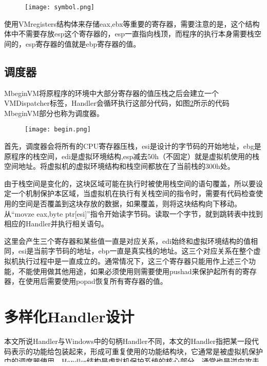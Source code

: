 \begin{figure}[htbp]
	
	\centering
	
	\texttt{[image: symbol.png]}
	\label{context}
\end{figure}

使用VMregisters结构体来存储eax,ebx等重要的寄存器，需要注意的是，这个结构体中不需要存放esp这个寄存器的，esp一直指向栈顶，而程序的执行本身需要栈空间的，esp寄存器的值就是ebp寄存器的值。

\subsection{调度器}

MbeginVM将原程序的环境中大部分寄存器的值压栈之后会建立一个VMDispatcher标签，Handler会循环执行这部分代码，如图\ref{begin}所示的代码MbeginVM部分也称为调度器。

\begin{figure}[htbp]
	\centering
	\texttt{[image: begin.png]}
	\label{begin}
\end{figure}


首先，调度器会将所有的CPU寄存器压栈，esi是设计的字节码的开始地址，ebg是原程序的栈空间，edi是虚拟环境结构,esp减去50h（不固定）就是虚拟机使用的栈空间地址。将虚拟机的虚拟环境结构和栈空间都放在了当前栈的300h处。

由于栈空间是变化的，这块区域可能在执行时被使用栈空间的语句覆盖，所以要设定一个机制保护本区域，当虚拟机在执行有关栈空间的指令时，需要有代码检查使用的空间是否覆盖到这块存放的数据，如果覆盖，则将这块结构向下移动。从“movze eax,byte ptr[esi]”指令开始读字节码。读取一个字节，就到跳转表中找到相应的Handler并执行相关语句。

这里会产生三个寄存器和某些值一直是对应关系，edi始终和虚拟环境结构的值相同，esi是当前字节码的地址，ebp一直是真实栈的地址。这三个对应关系在整个虚拟机执行过程中是一直成立的。通常情况下，这三个寄存器只能用作上述三个功能，不能使用做其他用途，如果必须使用则需要使用pushad来保护起所有的寄存器，在使用后需要使用popad恢复所有寄存器的值。


\section{多样化Handler设计}

本文所说Handler与Windows中的句柄Handler不同，本文的Handler指把某一段代码表示的功能给包装起来，形成可重复使用的功能结构块，它通常是被虚拟机保护中的调度器使用。Handler结构是虚拟机保护系统的核心部分，通常也是逆向攻击者的重点攻击对象，Handler结构中存放着字节码和汇编代码之间的转化过程，虽然可能这个转化过程不是通过一个Handler实现的，可能是由多个有着不同功能的Handler共同实现的，但是保护Handler等于保护了核心的翻译模块。所以，对Handler进行保护显得尤为重要，本节将会描述一种通过设计多样化的Handler使得逆向攻击者难以逆向分析字节码转化为汇编代码之间的翻译过程。

